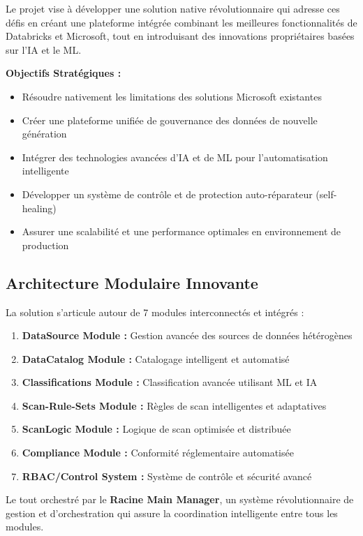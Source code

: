 \documentclass[a4paper,12pt]{article}
\begin{document}
Le projet vise à développer une solution native révolutionnaire qui adresse ces défis en créant une plateforme intégrée combinant les meilleures fonctionnalités de Databricks et Microsoft, tout en introduisant des innovations propriétaires basées sur l'IA et le ML.

\textbf{Objectifs Stratégiques :}
\begin{itemize}
    \item Résoudre nativement les limitations des solutions Microsoft existantes
    \item Créer une plateforme unifiée de gouvernance des données de nouvelle génération
    \item Intégrer des technologies avancées d'IA et de ML pour l'automatisation intelligente
    \item Développer un système de contrôle et de protection auto-réparateur (self-healing)
    \item Assurer une scalabilité et une performance optimales en environnement de production
\end{itemize}

\subsection{Architecture Modulaire Innovante}

La solution s'articule autour de 7 modules interconnectés et intégrés :

\begin{enumerate}
    \item \textbf{DataSource Module :} Gestion avancée des sources de données hétérogènes
    \item \textbf{DataCatalog Module :} Catalogage intelligent et automatisé
    \item \textbf{Classifications Module :} Classification avancée utilisant ML et IA
    \item \textbf{Scan-Rule-Sets Module :} Règles de scan intelligentes et adaptatives
    \item \textbf{ScanLogic Module :} Logique de scan optimisée et distribuée
    \item \textbf{Compliance Module :} Conformité réglementaire automatisée
    \item \textbf{RBAC/Control System :} Système de contrôle et sécurité avancé
\end{enumerate}

Le tout orchestré par le \textbf{Racine Main Manager}, un système révolutionnaire de gestion et d'orchestration qui assure la coordination intelligente entre tous les modules.
\end{document}
